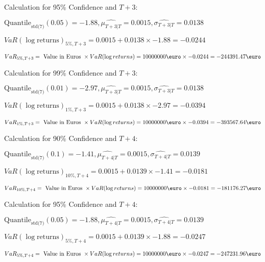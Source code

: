 Calculation for 95\% Confidence and $T+3$:

\indent\indent $\text{Quantile}_\text{std(7)}(0.05) = -1.88,\hat{\mu_{T+3|T}} = 0.0015, \hat{\sigma_{T+3|T}} = 0.0138$

\indent\indent $VaR(\log \text{returns})_{5\%, T + 3} = 0.0015 + 0.0138\times-1.88 = -0.0244$

\indent\indent $VaR_{5\%, T + 3} = \text{ Value in Euros } \times VaR(\log returns) = 10 000 000 \text{\euro} \times-0.0244 = -244391.47 \text{\euro}$\newline




Calculation for 99\% Confidence and $T+3$:

\indent\indent $\text{Quantile}_\text{std(7)}(0.01) = -2.97,\hat{\mu_{T+3|T}} = 0.0015, \hat{\sigma_{T+3|T}} = 0.0138$

\indent\indent $VaR(\log \text{returns})_{1\%, T + 3} = 0.0015 + 0.0138\times-2.97 = -0.0394$

\indent\indent $VaR_{1\%, T + 3} = \text{ Value in Euros } \times VaR(\log returns) = 10 000 000 \text{\euro} \times-0.0394 = -393567.64 \text{\euro}$\newline




Calculation for 90\% Confidence and $T+4$:

\indent\indent $\text{Quantile}_\text{std(7)}(0.1) = -1.41,\hat{\mu_{T+4|T}} = 0.0015, \hat{\sigma_{T+4|T}} = 0.0139$

\indent\indent $VaR(\log \text{returns})_{10\%, T + 4} = 0.0015 + 0.0139\times-1.41 = -0.0181$

\indent\indent $VaR_{10\%, T + 4} = \text{ Value in Euros } \times VaR(\log returns) = 10 000 000 \text{\euro} \times-0.0181 = -181176.27 \text{\euro}$\newline




Calculation for 95\% Confidence and $T+4$:

\indent\indent $\text{Quantile}_\text{std(7)}(0.05) = -1.88,\hat{\mu_{T+4|T}} = 0.0015, \hat{\sigma_{T+4|T}} = 0.0139$

\indent\indent $VaR(\log \text{returns})_{5\%, T + 4} = 0.0015 + 0.0139\times-1.88 = -0.0247$

\indent\indent $VaR_{5\%, T + 4} = \text{ Value in Euros } \times VaR(\log returns) = 10 000 000 \text{\euro} \times-0.0247 = -247231.96 \text{\euro}$\newline




